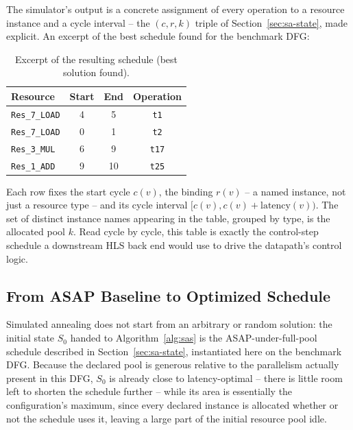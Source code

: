 \documentclass[conference]{IEEEtran}
\begin{document}
    The simulator's output is a concrete assignment of every operation to a resource instance and a
    cycle interval -- the $(c, r, k)$ triple of Section~\ref{sec:sa-state}, made explicit. An excerpt
    of the best schedule found for the benchmark DFG:
    \begin{table}[h]
        \centering
        \caption{Excerpt of the resulting schedule (best solution found).}
        \label{tab:gantt}
        \begin{tabular}{lccc}
            \toprule
            Resource & Start & End & Operation \\
            \midrule
            \texttt{Res\_7\_LOAD} & 4 & 5 & \texttt{t1} \\
            \texttt{Res\_7\_LOAD} & 0 & 1 & \texttt{t2} \\
            \texttt{Res\_3\_MUL}  & 6 & 9 & \texttt{t17} \\
            \texttt{Res\_1\_ADD}  & 9 & 10 & \texttt{t25} \\
            \bottomrule
        \end{tabular}
    \end{table}
    Each row fixes the start cycle $c(v)$, the binding $r(v)$ -- a named instance, not just a
    resource type -- and its cycle interval $[c(v), c(v) + \mathrm{latency}(v))$. The set of distinct
    instance names appearing in the table, grouped by type, is the allocated pool $k$. Read cycle by
    cycle, this table is exactly the control-step schedule a downstream HLS back end would use to
    drive the datapath's control logic.

    \subsection{From ASAP Baseline to Optimized Schedule}
    \label{sec:sim-process}

    Simulated annealing does not start from an arbitrary or random solution: the initial state
    $S_0$ handed to Algorithm~\ref{alg:sas} is the ASAP-under-full-pool schedule described in
    Section~\ref{sec:sa-state}, instantiated here on the benchmark DFG. Because the declared pool
    is generous relative to the parallelism actually present in this DFG, $S_0$ is already close to
    latency-optimal -- there is little room left to shorten the schedule further -- while its area
    is essentially the configuration's maximum, since every declared instance is allocated whether
    or not the schedule uses it, leaving a large part of the initial resource pool idle.
\end{document}

